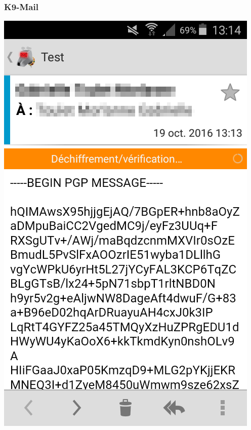 \documentclass{beamer}
\begin{document}
\begin{frame}
\frametitle{K9-Mail}
\begin{minipage}{0.4\textwidth}
\centering
    	\includegraphics[keepaspectratio, scale=0.25]{figures/K91.png}
    	\end{minipage}
\begin{minipage}{0.4\textwidth}
\centering

\end{minipage}
\end{frame}
\end{document}
